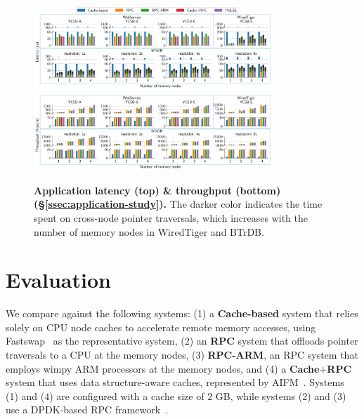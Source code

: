\begin{figure}[t]
\centering
  \includegraphics[width=0.8\textwidth]{fig/pulse/latency.pdf}
  \\
  \includegraphics[width=0.8\textwidth]{fig/pulse/throughput.pdf}
  \vspace{-1.3em}
  \caption[Application latency \& throughput]{\textbf{Application latency (top) \& throughput (bottom) (\S\ref{ssec:application-study}).} 
  The darker color indicates the time spent on cross-node pointer traversals, which increases with the number of memory nodes in WiredTiger and BTrDB.}
\label{fig:eval_perf_e2e_latency}
\label{fig:eval_perf_e2e_throughput}%
\end{figure}

\section{Evaluation}
\label{sec:evaluation}



 We compare \pulse against the following systems: 
(1) a \textbf{Cache-based} system that relies solely on CPU node caches to accelerate remote memory accesses, using Fastswap~\cite{fastswap} as the representative system, 
(2) an \textbf{RPC} system that offloads pointer traversals to a CPU at the memory nodes, 
(3) \textbf{RPC-ARM}, an RPC system that employs wimpy ARM processors at the memory nodes, and 
(4) a \textbf{Cache$+$RPC} system that uses data structure-aware caches, represented by AIFM~\cite{aifm}. Systems (1) and (4) are configured with a cache size of $2$ GB, while systems (2) and (3) use a DPDK-based RPC framework~\cite{erpc}.

